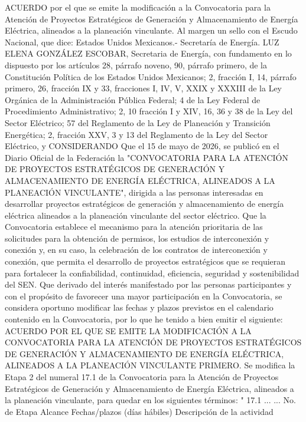 \begingroup
\senertexto
ACUERDO por el que se emite la modificación a la Convocatoria para la Atención de Proyectos Estratégicos de Generación y Almacenamiento de Energía Eléctrica, alineados a la planeación vinculante.
Al margen un sello con el Escudo Nacional, que dice: Estados Unidos Mexicanos.- Secretaría de Energía.
LUZ ELENA GONZÁLEZ ESCOBAR, Secretaria de Energía, con fundamento en lo dispuesto por los artículos 28, párrafo noveno, 90, párrafo primero, de la Constitución Política de los Estados Unidos Mexicanos; 2, fracción I, 14, párrafo primero, 26, fracción IX y 33, fracciones I, IV, V, XXIX y XXXIII de la Ley Orgánica de la Administración Pública Federal; 4 de la Ley Federal de Procedimiento Administrativo; 2, 10 fracción I y XIV, 16, 36 y 38 de la Ley del Sector Eléctrico; 57 del Reglamento de la Ley de Planeación y Transición Energética; 2, fracción XXV, 3 y 13 del Reglamento de la Ley del Sector Eléctrico, y
CONSIDERANDO
Que el 15 de mayo de 2026, se publicó en el Diario Oficial de la Federación la "CONVOCATORIA PARA LA ATENCIÓN DE PROYECTOS ESTRATÉGICOS DE GENERACIÓN Y ALMACENAMIENTO DE ENERGÍA ELÉCTRICA, ALINEADOS A LA PLANEACIÓN VINCULANTE", dirigida a las personas interesadas en desarrollar proyectos estratégicos de generación y almacenamiento de energía eléctrica alineados a la planeación vinculante del sector eléctrico.
Que la Convocatoria establece el mecanismo para la atención prioritaria de las solicitudes para la obtención de permisos, los estudios de interconexión y conexión y, en su caso, la celebración de los contratos de interconexión y conexión, que permita el desarrollo de proyectos estratégicos que se requieran para fortalecer la confiabilidad, continuidad, eficiencia, seguridad y sostenibilidad del SEN.
Que derivado del interés manifestado por las personas participantes y con el propósito de favorecer una mayor participación en la Convocatoria, se considera oportuno modificar las fechas y plazos previstos en el calendario contenido en la Convocatoria, por lo que he tenido a bien emitir el siguiente:
ACUERDO POR EL QUE SE EMITE LA MODIFICACIÓN A LA CONVOCATORIA  PARA LA ATENCIÓN DE PROYECTOS ESTRATÉGICOS DE GENERACIÓN Y ALMACENAMIENTO DE ENERGÍA ELÉCTRICA, ALINEADOS A LA PLANEACIÓN VINCULANTE
PRIMERO. Se modifica la Etapa 2 del numeral 17.1 de la Convocatoria para la Atención de Proyectos Estratégicos de Generación y Almacenamiento de Energía Eléctrica, alineados a la planeación vinculante, para quedar en los siguientes términos:
"
17.1 ...
...
No. de Etapa
 Alcance
 Fechas/plazos (días hábiles)
 Descripción de la actividad
 
